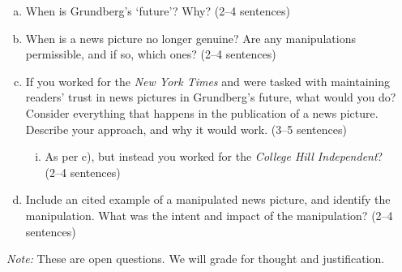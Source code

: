 \begin{enumerate}[(a)]
    \item When is Grundberg's `future'? Why? (2--4 sentences)
    
    \item When is a news picture no longer genuine? Are any manipulations permissible, and if so, which ones? (2--4 sentences)
    
    \item If you worked for the \emph{New York Times} and were tasked with maintaining readers' trust in news pictures in Grundberg's future, what would you do? Consider everything that happens in the publication of a news picture. Describe your approach, and why it would work. (3--5 sentences)
    
    \begin{enumerate}[(i)]
    \item As per c), but instead you worked for the \emph{College Hill Independent}? \\(2--4 sentences)
    \end{enumerate}
    
    \item Include an cited example of a manipulated news picture, and identify the manipulation. What was the intent and impact of the manipulation? (2--4 sentences)
\end{enumerate}

\emph{Note:} These are open questions. We will grade for thought and justification. 



